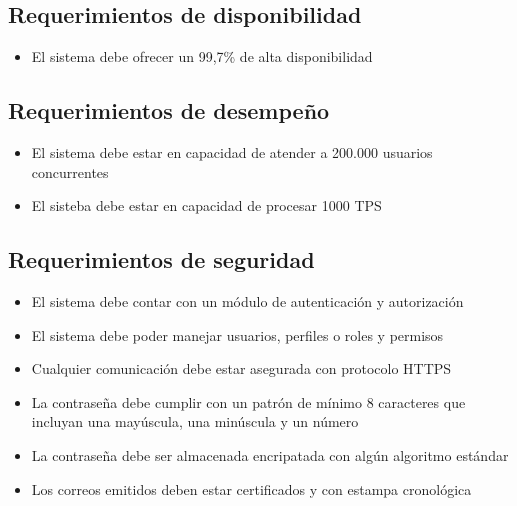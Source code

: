 \documentclass[letterpaper,10pt,spanish]{sphinxmanual}
\begin{document}
\subsection{Requerimientos de disponibilidad}
\label{\detokenize{SRS:requerimientos-de-disponibilidad}}\begin{itemize}
\item {} 
\sphinxAtStartPar
El sistema debe ofrecer un 99,7\% de alta disponibilidad

\end{itemize}


\subsection{Requerimientos de desempeño}
\label{\detokenize{SRS:requerimientos-de-desempeno}}\begin{itemize}
\item {} 
\sphinxAtStartPar
El sistema debe estar en capacidad de atender a 200.000 usuarios concurrentes

\item {} 
\sphinxAtStartPar
El sisteba debe estar en capacidad de  procesar 1000 TPS

\end{itemize}


\subsection{Requerimientos de seguridad}
\label{\detokenize{SRS:requerimientos-de-seguridad}}\begin{itemize}
\item {} 
\sphinxAtStartPar
El sistema debe contar con un módulo de autenticación y autorización

\item {} 
\sphinxAtStartPar
El sistema debe poder manejar usuarios, perfiles o roles y permisos

\item {} 
\sphinxAtStartPar
Cualquier comunicación debe estar asegurada con protocolo HTTPS

\item {} 
\sphinxAtStartPar
La contraseña debe cumplir con un patrón de mínimo 8 caracteres que incluyan una mayúscula, una minúscula y un número

\item {} 
\sphinxAtStartPar
La contraseña debe ser almacenada encripatada con algún algoritmo estándar

\item {} 
\sphinxAtStartPar
Los correos emitidos deben estar certificados y con estampa cronológica

\end{itemize}
\end{document}
